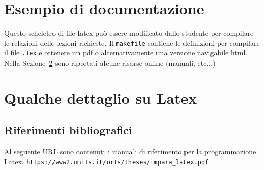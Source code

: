 \documentclass{article}
\begin{document}
\section{Esempio di documentazione}
Questo scheletro di file latex pu\`o essere modificato dallo studente
per compilare le relazioni delle lezioni richieste.
Il {\tt makefile} contiene le definizioni per compilare il file {\tt .tex}
e ottenere un pdf o alternativamente una versione navigabile html.
Nella Sezione~\ref{sec:dettagli} sono riportati alcune risorse online (manuali, etc...)

\section{Qualche dettaglio su Latex}
\label{sec:dettagli}
\subsection{Riferimenti bibliografici}
Al seguente URL sono contenuti i manuali di riferimento per la programmazione Latex.
{\tt https://www2.units.it/orts/theses/impara\_latex.pdf}
\end{document}
